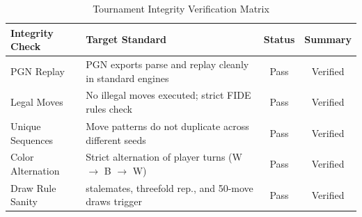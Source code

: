 \begin{table}[htbp]
\caption{Tournament Integrity Verification Matrix}
\label{tab:integrity_verification}
\centering
\begin{tabular}{lp{3.5cm}cc}
\toprule
\textbf{Integrity Check} & \textbf{Target Standard} & \textbf{Status} & \textbf{Summary} \\
\midrule
PGN Replay       & PGN exports parse and replay cleanly in standard engines & Pass & Verified \\
Legal Moves      & No illegal moves executed; strict FIDE rules check & Pass & Verified \\
Unique Sequences & Move patterns do not duplicate across different seeds & Pass & Verified \\
Color Alternation& Strict alternation of player turns (W $\to$ B $\to$ W) & Pass & Verified \\
Draw Rule Sanity & stalemates, threefold rep., and 50-move draws trigger & Pass & Verified \\
\bottomrule
\end{tabular}
\end{table}
